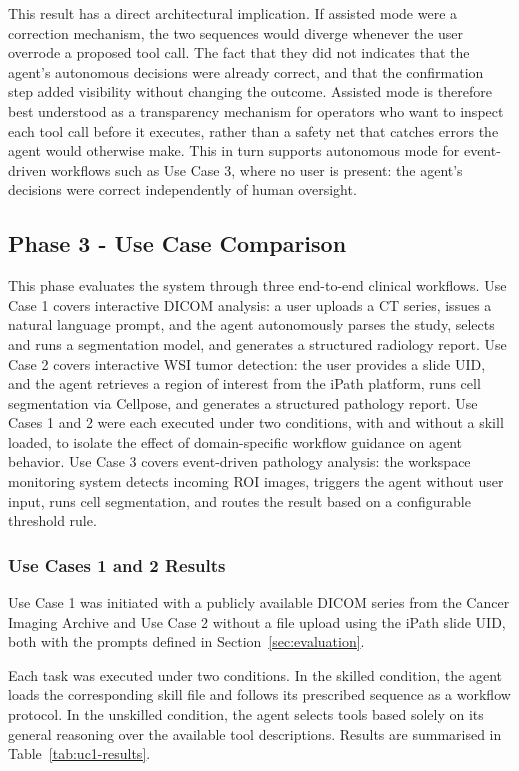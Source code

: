 \documentclass[conference]{IEEEtran}
\begin{document}
This result has a direct architectural implication. If assisted mode were a correction mechanism, the two sequences would diverge whenever the user overrode a proposed tool call. The fact that they did not indicates that the agent's autonomous decisions were already correct, and that the confirmation step added visibility without changing the outcome.
Assisted mode is therefore best understood as a transparency mechanism for operators who want to inspect each tool call before it executes, rather than a safety net that catches errors the agent would otherwise make.
This in turn supports autonomous mode for event-driven workflows such as Use Case 3, where no user is present: the agent's decisions were correct independently of human oversight.




\subsection{Phase 3 - Use Case Comparison}

This phase evaluates the system through three end-to-end clinical workflows. Use Case 1 covers interactive DICOM analysis: a user uploads a CT series, issues a natural language prompt, and the agent autonomously parses the study, selects and runs a segmentation model, and generates a structured radiology report. Use Case 2 covers interactive WSI tumor detection: the user provides a slide UID, and the agent retrieves a region of interest from the iPath platform, runs cell segmentation via Cellpose, and generates a structured pathology report. Use Cases 1 and 2 were each executed under two conditions, with and without a skill loaded, to isolate the effect of domain-specific workflow guidance on agent behavior. Use Case 3 covers event-driven pathology analysis: the workspace monitoring system detects incoming ROI images, triggers the agent without user input, runs cell segmentation, and routes the result based on a configurable threshold rule.

\subsubsection{Use Cases 1 and 2 Results}
Use Case 1 was initiated with a publicly available DICOM series from the Cancer Imaging Archive and Use Case 2 without a file upload using the iPath slide UID, both with the prompts defined in Section~\ref{sec:evaluation}.

Each task was executed under two conditions. In the skilled condition, the agent loads the corresponding skill file and follows its prescribed sequence as a workflow protocol. In the unskilled condition, the agent selects tools based solely on its general reasoning over the available tool descriptions. Results are summarised in Table~\ref{tab:uc1-results}.
\end{document}
